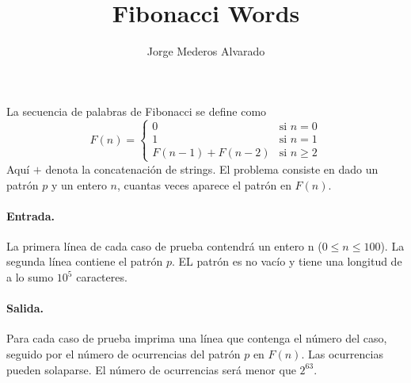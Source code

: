 \documentclass{article}
\begin{document}
\begin{titlepage}
	\title{\textbf{Fibonacci Words}}
	\author{Jorge Mederos Alvarado}
	\date{}
								
	\maketitle
				
	\begin{statement}
		La secuencia de palabras de Fibonacci se define como
		\begin{equation*}
			F(n)=
			\begin{cases}
				0               & \text{si $n = 0$}  \\
				1               & \text{si $n = 1$}  \\
				F(n-1) + F(n-2) & \text{si $n\ge 2$} 
			\end{cases}
		\end{equation*}
		Aquí $+$ denota la concatenación de strings. El problema 
		consiste en dado un patrón $p$ y un entero $n$, cuantas veces aparece el 
		patrón en $F(n)$.
															
		\paragraph*{Entrada.} La primera línea de cada caso de prueba contendrá un 
		entero n ($0\le n\le 100$). La segunda línea contiene el patrón $p$. EL 
		patrón es no vacío y tiene una longitud de a lo sumo $10^5$ caracteres.
															
		\paragraph*{Salida.} Para cada caso de prueba imprima una línea que contenga 
		el número del caso, seguido por el número de ocurrencias del patrón $p$ en
		$F(n)$. Las ocurrencias pueden solaparse. El número de ocurrencias será 
		menor que $2^{63}$.
								    

\end{statement}
\end{titlepage}
\end{document}
